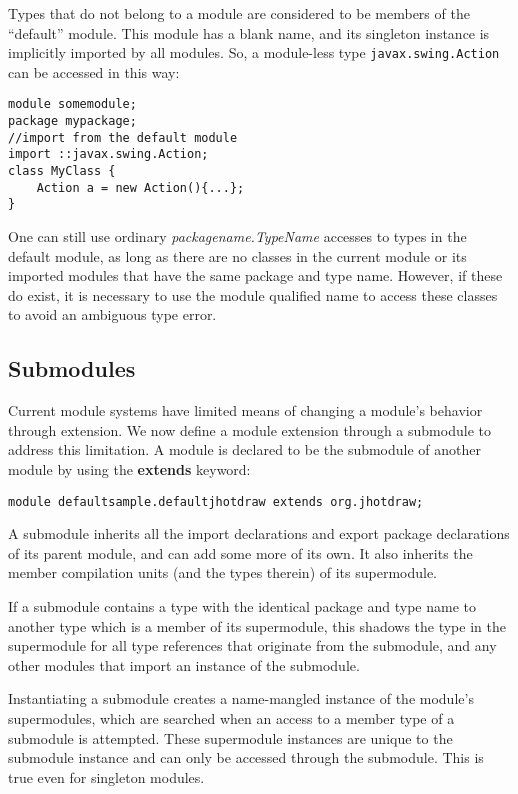 Types that do not belong to a module are considered to be members of
the ``default'' module. This module has a blank name, and its singleton
instance is implicitly imported by all modules. So, a module-less
type {\tt javax.swing.Action} can be accessed in this way:

\begin{lstlisting}[caption=Default Module Lookups]
module somemodule;
package mypackage;
//import from the default module
import ::javax.swing.Action;
class MyClass {
	Action a = new Action(){...};
}
\end{lstlisting}

One can still use ordinary \textit{packagename.TypeName} accesses to types in
the default module, as long as there are no classes in the current module
or its imported modules that have the same package and type name. However,
if these do exist, it is necessary to use the module qualified name to access
these classes to avoid an ambiguous type error.

\subsection{Submodules}

Current module systems have limited means of changing a module's behavior through
extension. We now define a module extension through a submodule to address this limitation. 
A module is declared to be the submodule of another module by using the \textbf{extends} keyword:

\begin{lstlisting}
module defaultsample.defaultjhotdraw extends org.jhotdraw;
\end{lstlisting}

A submodule inherits all the import declarations and export package declarations 
of its parent module, and can add some more of its own. It also inherits the member 
compilation units (and the types therein) of its supermodule.

If a submodule contains a type with the identical package and type name
to another type which is a member of its supermodule, 
this shadows the type in the supermodule for all type references that
originate from the submodule, and any other modules that import an
instance of the submodule.

Instantiating a submodule creates a name-mangled instance of the module's supermodules,
which are searched when an access to a member type of a submodule is attempted. These
supermodule instances are unique to the submodule instance and can only be accessed
through the submodule. This is true even for singleton modules.

